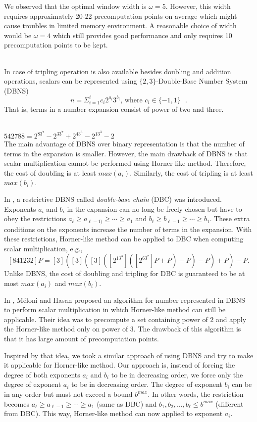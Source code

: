 We observed that the optimal window width is $\omega = 5$.
However, this width requires approximately 20-22 precomputation points on average
which might cause troubles in limited memory environment.
A reasonable choice of width would be $\omega = 4$ which still provides good performance
and only requires 10 precomputation points to be kept.



 \\
\label{sec:dbns}
In case of tripling operation is also available besides doubling and addition operations,
scalars can be represented using $\{2,3\}$-Double-Base Number System (DBNS)
$$n = \Sigma^{\ell}_{i=1} c_i 2^{a_i}3^{b_i} \text{, where $c_i \in \{-1,1\}$ }.$$
That is, terms in a number expansion consist of power of two and three.

 \\
$542788 = 2^83^7 - 2^33^7 + 2^43^3 - 2^13^3 - 2$
\\

The main advantage of DBNS over binary representation is that the number of terms in the expansion is smaller.
However, the main drawback of DBNS is that scalar multiplication cannot be performed using Horner-like method.
Therefore, the cost of doubling is at least $max(a_i)$.  Similarly, the cost of tripling is at least $max(b_i)$.

In \cite{DIM05}, a restrictive DBNS called {\it{double-base chain}} (DBC) was introduced.
Exponents $a_i$ and $b_i$ in the expansion can no long be freely chosen but have to obey the restrictions
$a_\ell \ge a_{\ell-1)} \ge \cdots \ge a_1$ and $b_\ell \ge b_{\ell-1} \ge \cdots \ge b_1$.
These extra conditions on the exponents increase the number of terms in the expansion.
With these restrictions, Horner-like method can be applied to DBC when computing scalar multiplication, e.g.,
$$[841232]P = [3]([3]([3]([2^13^3]([2^63^2]P+P)-P)-P)+P)-P.$$
Unlike DBNS, the cost of doubling and tripling for DBC is guaranteed to be at most $max(a_i)$ and $max(b_i)$.

In \cite{MH09}, M\'eloni and Hasan proposed an algorithm for number represented in DBNS to perform scalar multiplication
in which Horner-like method can still be applicable.
Their idea was to precompute a set containing power of $2$ and apply the Horner-like method only on power of $3$.
The drawback of this algorithm is that it has large amount of precomputation points.

Inspired by that idea, we took a similar approach of using DBNS and try to make it applicable for Horner-like method.
Our approach is, instead of forcing the degree of both exponents $a_i$ and $b_i$ to be in decreasing order,
we force only the degree of exponent $a_i$ to be in decreasing order.
The degree of exponent $b_i$ can be in any order but must not exceed a bound $b^{max}$.
In other words, the restriction becomes
$a_\ell \ge a_{\ell-1} \ge \cdots \ge a_1$ (same as DBC) and $b_1,b_2,\dots,b_\ell \le b^{max}$ (different from DBC).
This way, Horner-like method can now applied to exponent $a_i$.

